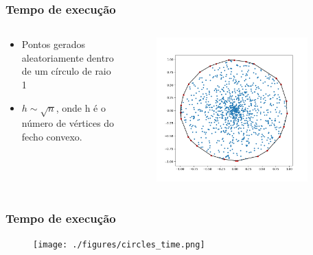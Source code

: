 \documentclass[aspectratio=169,usenames,dvipsnames]{beamer}
\begin{document}
\begin{frame}
\frametitle{Tempo de execução}
\begin{columns}
  \begin{column}{0.4\textwidth}
  \begin{itemize}
    \item Pontos gerados aleatoriamente dentro de um círculo de raio 1
    \item $h \sim \sqrt{n}$, onde h é o número de vértices do fecho convexo.
  \end{itemize}
  \end{column}
  \begin{column}{0.6\textwidth}
    \begin{figure}
      \includegraphics[width=0.9\textwidth]{./figures/random_circlw.png}
    \end{figure}
  \end{column}
\end{columns}
  
\end{frame}

\begin{frame}
\frametitle{Tempo de execução}
    \begin{figure}
      \texttt{[image: ./figures/circles\_time.png]}
    \end{figure}
\end{frame}
\end{document}
